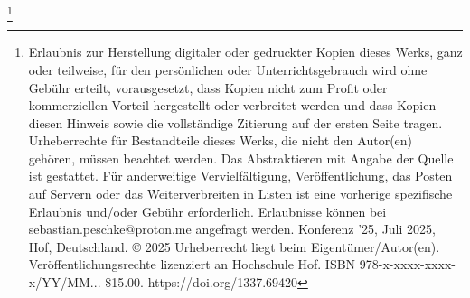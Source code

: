 

\thanks{Erlaubnis zur Herstellung digitaler oder gedruckter Kopien dieses Werks, ganz oder teilweise, für den persönlichen oder Unterrichtsgebrauch wird ohne Gebühr erteilt, vorausgesetzt, dass Kopien nicht zum Profit oder kommerziellen Vorteil hergestellt oder verbreitet werden und dass Kopien diesen Hinweis sowie die vollständige Zitierung auf der ersten Seite tragen. Urheberrechte für Bestandteile dieses Werks, die nicht den Autor(en) gehören, müssen beachtet werden. Das Abstraktieren mit Angabe der Quelle ist gestattet. Für anderweitige Vervielfältigung, Veröffentlichung, das Posten auf Servern oder das Weiterverbreiten in Listen ist eine vorherige spezifische Erlaubnis und/oder Gebühr erforderlich. Erlaubnisse können bei sebastian.peschke@proton.me angefragt werden. Konferenz ’25, Juli 2025, Hof, Deutschland. © 2025 Urheberrecht liegt beim Eigentümer/Autor(en). Veröffentlichungsrechte lizenziert an Hochschule Hof. ISBN 978-x-xxxx-xxxx-x/YY/MM... \$15.00. https://doi.org/1337.69420}
\usepackage{csquotes}
\usepackage[ngerman]{babel}
\usepackage{siunitx}

\renewcommand{\keywordsname}{Schlüsselwörter}
\renewcommand{\figurename}{Abbildung}
